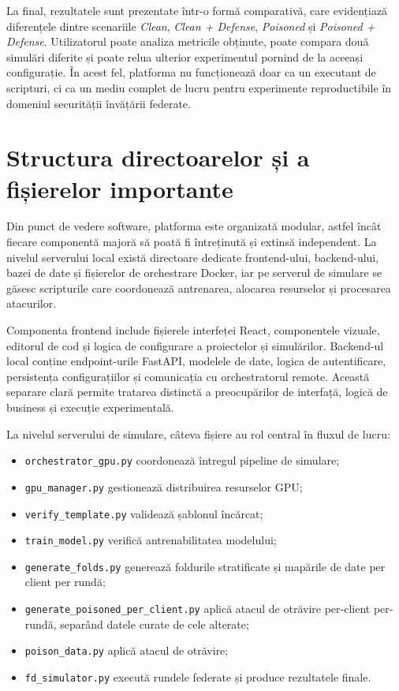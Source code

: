 \documentclass[../../main.tex]{subfiles}
\begin{document}
    La final, rezultatele sunt prezentate într-o formă comparativă, care evidențiază diferențele dintre scenariile \textit{Clean}, \textit{Clean + Defense}, \textit{Poisoned} și \textit{Poisoned + Defense}. Utilizatorul poate analiza metricile obținute, poate compara două simulări diferite și poate relua ulterior experimentul pornind de la aceeași configura\-ție. În acest fel, platforma nu funcționează doar ca un executant de scripturi, ci ca un mediu complet de lucru pentru experimente reproductibile în domeniul securității învățării federate.

    \section{Structura directoarelor și a fișierelor importante}

    Din punct de vedere software, platforma este organizată modular, astfel încât fiecare componentă majoră să poată fi întreținută și extinsă independent. La nivelul serverului local există directoare dedicate frontend-ului, backend-ului, bazei de date și fișierelor de orchestrare Docker, iar pe serverul de simulare se găsesc scripturile care coordonează antrenarea, alocarea resurselor și procesarea atacurilor.

    Componenta frontend include fișierele interfeței React, componentele vizuale, editorul de cod și logica de configurare a proiectelor și simulărilor. Backend-ul local conține endpoint-urile FastAPI, modelele de date, logica de autentificare, persistența configurațiilor și comunicația cu orchestratorul remote. Această separare clară permite tratarea distinctă a preocupărilor de interfață, logică de business și execuție experimentală.

    La nivelul serverului de simulare, câteva fișiere au rol central în fluxul de lucru:

    \begin{itemize}
        \item \texttt{orchestrator\_gpu.py} coordonează întregul pipeline de simulare;
        \item \texttt{gpu\_manager.py} gestionează distribuirea resurselor GPU;
        \item \texttt{verify\_template.py} validează șablonul încărcat;
        \item \texttt{train\_model.py} verifică antrenabilitatea modelului;
        \item \texttt{generate\_folds.py} generează foldurile stratificate și mapările de date per client per rundă;
        \item \texttt{generate\_poisoned\_per\_client.py} aplică atacul de otrăvire per-client per-rundă, separând datele curate de cele alterate;
        \item \texttt{poison\_data.py} aplică atacul de otrăvire;
        \item \texttt{fd\_simulator.py} execută rundele federate și produce rezultatele finale.
    \end{itemize}
\end{document}
